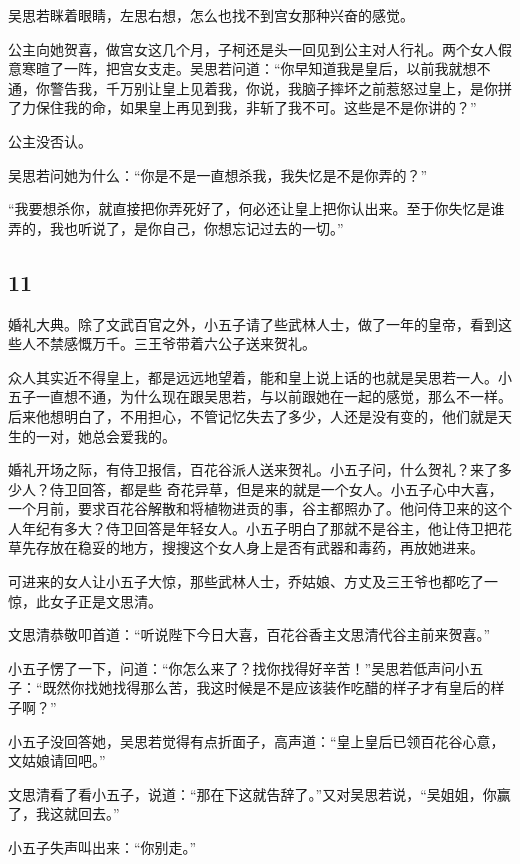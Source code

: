 吴思若眯着眼睛，左思右想，怎么也找不到宫女那种兴奋的感觉。

公主向她贺喜，做宫女这几个月，子柯还是头一回见到公主对人行礼。两个女人假意寒暄了一阵，把宫女支走。吴思若问道：“你早知道我是皇后，以前我就想不通，你警告我，千万别让皇上见着我，你说，我脑子摔坏之前惹怒过皇上，是你拼了力保住我的命，如果皇上再见到我，非斩了我不可。这些是不是你讲的？”

公主没否认。

吴思若问她为什么：“你是不是一直想杀我，我失忆是不是你弄的？”

“我要想杀你，就直接把你弄死好了，何必还让皇上把你认出来。至于你失忆是谁弄的，我也听说了，是你自己，你想忘记过去的一切。”
\newline

{\centering\subsection{11}}

婚礼大典。除了文武百官之外，小五子请了些武林人士，做了一年的皇帝，看到这些人不禁感慨万千。三王爷带着六公子送来贺礼。

众人其实近不得皇上，都是远远地望着，能和皇上说上话的也就是吴思若一人。小五子一直想不通，为什么现在跟吴思若，与以前跟她在一起的感觉，那么不一样。后来他想明白了，不用担心，不管记忆失去了多少，人还是没有变的，他们就是天生的一对，她总会爱我的。

婚礼开场之际，有侍卫报信，百花谷派人送来贺礼。小五子问，什么贺礼？来了多少人？侍卫回答，都是些
奇花异草，但是来的就是一个女人。小五子心中大喜，一个月前，要求百花谷解散和将植物进贡的事，谷主都照办了。他问侍卫来的这个人年纪有多大？侍卫回答是年轻女人。小五子明白了那就不是谷主，他让侍卫把花草先存放在稳妥的地方，搜搜这个女人身上是否有武器和毒药，再放她进来。

可进来的女人让小五子大惊，那些武林人士，乔姑娘、方丈及三王爷也都吃了一惊，此女子正是文思清。
\newline

文思清恭敬叩首道：“听说陛下今日大喜，百花谷香主文思清代谷主前来贺喜。”

小五子愣了一下，问道：“你怎么来了？找你找得好辛苦！”吴思若低声问小五子：“既然你找她找得那么苦，我这时候是不是应该装作吃醋的样子才有皇后的样子啊？”

小五子没回答她，吴思若觉得有点折面子，高声道：“皇上皇后已领百花谷心意，文姑娘请回吧。”

文思清看了看小五子，说道：“那在下这就告辞了。”又对吴思若说，“吴姐姐，你赢了，我这就回去。”

小五子失声叫出来：“你别走。”

